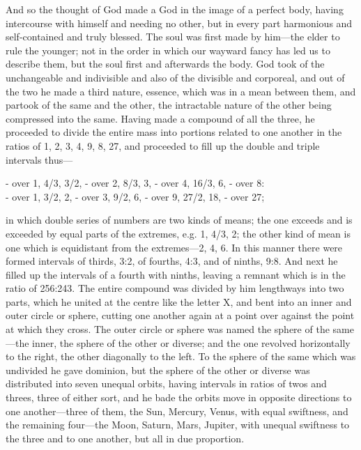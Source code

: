 And so the thought of God made a God in the image of a perfect body,
having intercourse with himself and needing no other, but in every part
harmonious and self-contained and truly blessed. The soul was first made
by him—the elder to rule the younger; not in the order in which our
wayward fancy has led us to describe them, but the soul first and
afterwards the body. God took of the unchangeable and indivisible and also
of the divisible and corporeal, and out of the two he made a third nature,
essence, which was in a mean between them, and partook of the same and the
other, the intractable nature of the other being compressed into the same.
Having made a compound of all the three, he proceeded to divide the entire
mass into portions related to one another in the ratios of 1, 2, 3, 4, 9,
8, 27, and proceeded to fill up the double and triple intervals thus—

- over 1, 4/3, 3/2, - over 2, 8/3, 3, - over 4, 16/3, 6, - over 8:\\
- over 1, 3/2, 2, - over 3, 9/2, 6, - over 9, 27/2, 18, - over 27;

in which double series of numbers are two kinds of means; the one exceeds
and is exceeded by equal parts of the extremes, e.g. 1, 4/3, 2; the other
kind of mean is one which is equidistant from the extremes—2, 4, 6.
In this manner there were formed intervals of thirds, 3:2, of fourths,
4:3, and of ninths, 9:8. And next he filled up the intervals of a fourth
with ninths, leaving a remnant which is in the ratio of 256:243. The
entire compound was divided by him lengthways into two parts, which he
united at the centre like the letter X, and bent into an inner and outer
circle or sphere, cutting one another again at a point over against the
point at which they cross. The outer circle or sphere was named the sphere
of the same—the inner, the sphere of the other or diverse; and the
one revolved horizontally to the right, the other diagonally to the left.
To the sphere of the same which was undivided he gave dominion, but the
sphere of the other or diverse was distributed into seven unequal orbits,
having intervals in ratios of twos and threes, three of either sort, and
he bade the orbits move in opposite directions to one another—three
of them, the Sun, Mercury, Venus, with equal swiftness, and the remaining
four—the Moon, Saturn, Mars, Jupiter, with unequal swiftness to the
three and to one another, but all in due proportion.

